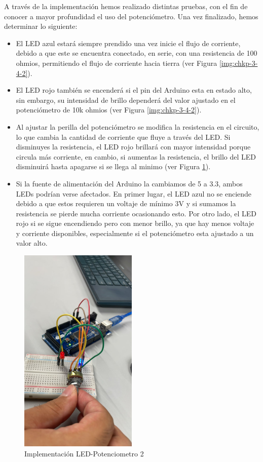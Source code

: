 \documentclass{article}
\begin{document}
A través de la implementación hemos realizado distintas pruebas, con el fin de conocer a mayor profundidad el uso del potenciómetro. Una vez finalizado, hemos determinar lo siguiente:
\begin{itemize}
    \item El LED azul estará siempre prendido una vez inicie el flujo de corriente, debido a que este se encuentra conectado, en serie, con una resistencia de 100 ohmios, permitiendo el flujo de corriente hacia tierra (ver Figura \ref{img:chkp-3-4-2}).
    \item El LED rojo también se encenderá si el pin del Arduino esta en estado alto, sin embargo, su intensidad de brillo dependerá del valor ajustado en el potenciómetro de 10k ohmios (ver Figura \ref{img:chkp-3-4-2}).
    \item Al ajustar la perilla del potenciómetro se modifica la resistencia en el circuito, lo que cambia la cantidad de corriente que fluye a través del LED. Si disminuyes la resistencia, el LED rojo brillará con mayor intensidad porque circula más corriente, en cambio, si aumentas la resistencia, el brillo del LED disminuirá hasta apagarse si se llega al minimo (ver Figura \ref{img:chkp-3-4-1}).
    \item Si la fuente de alimentación del Arduino la cambiamos de 5 a 3.3, ambos LEDs podrían verse afectados. En primer lugar, el LED azul no se enciende debido a que estos requieren un voltaje de mínimo 3V y si sumamos la resistencia se pierde mucha corriente ocasionando esto. Por otro lado, el LED rojo si se sigue encendiendo pero con menor brillo, ya que hay menos voltaje y corriente disponibles, especialmente si el potenciómetro esta ajustado a un valor alto.
\end{itemize}

\begin{figure}[H]
    \centering
    \includegraphics[width=0.50\textwidth]{./img/chkp-3-4-1.jpeg}
    \caption{Implementación LED-Potenciometro 2}
    \label{img:chkp-3-4-1}
\end{figure}
\end{document}
